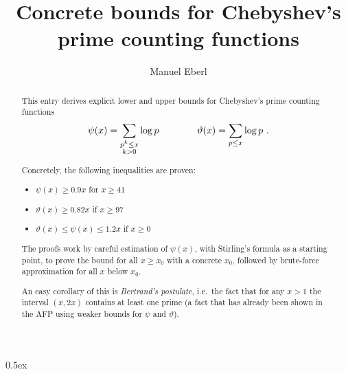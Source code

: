 \documentclass[11pt,a4paper]{article}
\begin{document}
\title{Concrete bounds for Chebyshev's prime counting functions}
\author{Manuel Eberl}
\maketitle

\begin{abstract}
This entry derives explicit lower and upper bounds for Chebyshev's prime counting functions
\[\psi(x) = \sum_{\substack{p^k \leq x \\ k > 0}} \log p\hskip4em \vartheta(x) = \sum_{p\leq x} \log p\ .\]

\noindent Concretely, the following inequalities are proven:
\begin{itemize}
\item $\psi(x)\geq 0.9x$ for $x\geq 41$
\item $\vartheta(x) \geq 0.82x$ if $x\geq 97$
\item $\vartheta(x) \leq \psi(x) \leq 1.2x$ if $x\geq 0$
\end{itemize}
The proofs work by careful estimation of $\psi(x)$, with
Stirling's formula as a starting point, to prove the bound for 
all $x\geq x_0$ with a concrete $x_0$, followed by brute-force
approximation for all $x$ below $x_0$.

An easy corollary of this is \emph{Bertrand's postulate}, i.e.\ the fact that for any
$x > 1$ the interval $(x,2x)$ contains at least one prime (a fact that has already
been shown in the AFP using weaker bounds for $\psi$ and $\vartheta$).
\end{abstract}

\tableofcontents

\newpage
\parindent 0pt\parskip 0.5ex



\nocite{niven1947}
\raggedright


\end{document}
